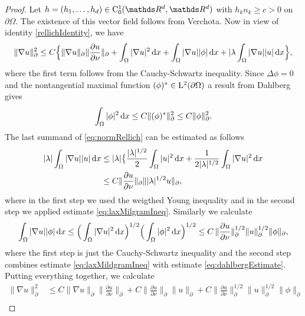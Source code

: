 \begin{proof}
  Let $h = (h_1, \dots, h_d) \in \CC_0^1(\R^d, \R^d)$ with $h_k n_k \geq c > 0$ on $\partial \Omega$. 
  The existence of this vector field follows from Verchota.
  Now in view of identity \eqref{rellichIdentity}, we have
  \begin{align}
    \label{eq:normRellich}
    \|\nabla u\|_\partial^2
    \leq C \Big\{ \|\nabla u\|_\partial \| \frac{\partial u}{\partial \nu} \|_\partial + \int_\Omega |\nabla u|^2 \, {\operatorname{d}\!{x}} + \int_\Omega |\nabla u| |\phi| \, {\operatorname{d}\!{x}} + |\lambda \int_\Omega |\nabla u| |u| \, {\operatorname{d}\!{x}} \Big\},
  \end{align}
  where the first term follows from the Cauchy-Schwartz inequality.
  Since $\Delta \phi = 0$ and the nontangential maximal function $(\phi)^* \in \mathrm{L}^2(\partial\Omega)$ a result from Dahlberg \cite{dahlberg} gives
  \begin{align}
    \label{eq:dahlbergEstimate}
    \int_\Omega |\phi|^2 \, {\operatorname{d}\!{x}} \leq C \|(\phi)^* \|_\partial^2 \leq C \|\phi\|_\partial^2.
  \end{align}
  The last summand of \eqref{eq:normRellich} can be estimated as follows
  \begin{align}
    |\lambda| \int_\Omega |\nabla u| |u| \, {\operatorname{d}\!{x}} 
    &\leq |\lambda| \big\{ \frac{|\lambda|^{1/2}}{2} \int_\Omega |u|^2 \, {\operatorname{d}\!{x}} + \frac{1}{2 |\lambda|^{1/2}} \int_\Omega |\nabla u|^2 \, {\operatorname{d}\!{x}} \nonumber\\\label{eq:lambdaNablaU}
    &\leq C \| \frac{\partial u}{\partial \nu} \|_\partial \| |\lambda|^{1/2} u\|_\partial, 
  \end{align}
  where in the first step we used the weigthed Young inequality and in the second step we applied estimate \eqref{eq:laxMilgramIneq}.
  Similarly we calculate
  \begin{align}
    \int_\Omega |\nabla u| |\phi| \, {\operatorname{d}\!{x}}
    \leq \Big( \int_\Omega |\nabla u|^2 \, {\operatorname{d}\!{x}} \Big)^{1/2} \Big( \int_\Omega |\phi|^2 \, {\operatorname{d}\!{x}} \Big)^{1/2}
    \leq C \, \| \frac{\partial u}{\partial \nu} \|_\partial^{1/2} \|u\|_\partial^{1/2} \|\phi\|_\partial, \label{eq:nablaPhi}
  \end{align}
  where the first step is just the Cauchy-Schwartz inequality and the second step combines estimate \eqref{eq:laxMildgramIneq} with estimate \eqref{eq:dahlbergEstimate}.
  Putting everything together, we calculate
  \begin{align*}
    \| \nabla u\|_\partial^2 
    &\leq C \| \nabla u\|_\partial \|\frac{\partial u}{\partial \nu} \|_\partial + C \| \frac{\partial u}{\partial \nu} \|_\partial \|u\|_\partial + C \| \frac{\partial u}{\partial \nu} \|_\partial^{1/2} \|u\|_\partial^{1/2} \|\phi\|_\partial \\

\end{align*}
\end{proof}
